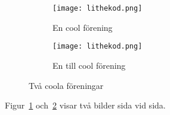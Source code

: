 \documentclass[preview]{standalone}
\begin{document}
\begin{figure}
    \centering
    \begin{subfigure}{.45\textwidth}
        \texttt{[image: lithekod.png]}
        \caption{En cool förening}
        \label{fig:subfig1}
    \end{subfigure}\quad%
    \begin{subfigure}{.45\textwidth}
        \texttt{[image: lithekod.png]}
        \caption{En till cool förening}
        \label{fig:subfig2}
    \end{subfigure}
    \caption{Två coola föreningar}
    \label{fig:mainfig}
\end{figure}
\hspace{1em}Figur~\ref{fig:subfig1} och~\ref{fig:subfig2} visar två bilder sida vid
sida.
\vspace{1em}
\end{document}
